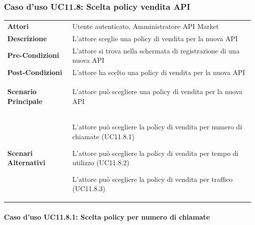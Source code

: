 \subsubsection{Caso d'uso UC11.8: Scelta policy vendita API}
\label{UC9_2}

\begin{minipage}{\linewidth}
	\begin{tabular}{ l | p{11cm}}
		\hline
		\rowcolor{Gray}
		\multicolumn{2}{c}{UC11.8.2 - Scelta policy vendita API} \\
		\hline
		\textbf{Attori} & Utente autenticato, Amministratore API Market \\
		\textbf{Descrizione} & L'attore sceglie una policy di vendita per la nuova API \\
		\textbf{Pre-Condizioni} & L'attore si trova nella schermata di registrazione di una nuova API \\
		\textbf{Post-Condizioni} & L'attore ha scelto una policy di vendita per la nuova API \\
		\textbf{Scenario Principale} & 
		\begin{enumerate*}[label=(\arabic*.),itemjoin={\newline}]
			\item L'attore può scegliere una policy di vendita per la nuova API
		\end{enumerate*}\\
		\textbf{Scenari Alternativi} & 
		\begin{enumerate*}[label=(\arabic*.),itemjoin={\newline}]
			\item L'attore può scegliere la policy di vendita per numero di chiamate (UC11.8.1)
			\item L'attore può scegliere la policy di vendita per tempo di utilizzo (UC11.8.2)
			\item L'attore può scegliere la policy di vendita per traffico (UC11.8.3)	
		\end{enumerate*}\\
	\end{tabular}
\end{minipage}

\paragraph{Caso d'uso UC11.8.1: Scelta policy per numero di chiamate}
\label{UC11_8_1}

